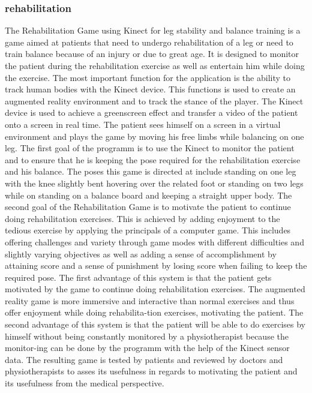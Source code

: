 \subsubsection{rehabilitation}
The Rehabilitation Game using Kinect for leg stability and balance training is a game aimed at patients that need to undergo rehabilitation of a leg or need to train balance because of an injury or due to great age. It is designed to monitor the patient during the rehabilitation exercise as well as entertain him while doing the exercise. The most important function for the application is the ability to track human bodies with the Kinect device. This functions is used to create an augmented reality environment and to track the stance of the player.
The Kinect device is used to achieve a greenscreen effect and transfer a video of the patient onto a screen in real time. The patient sees himself on a screen in a virtual environment and plays the game by moving his free limbs while balancing on one leg. The first goal of the programm is to use the Kinect to monitor the patient and to ensure that he is keeping the pose required for the rehabilitation exercise and his balance. The poses this game is directed at include standing on one leg with the knee slightly bent hovering over the related foot or standing on two legs while on standing on a balance board and keeping a straight upper body.
The second goal of the Rehabilitation Game is to motivate the patient to continue doing rehabilitation exercises. This is achieved by adding enjoyment to the tedious exercise by applying the principals of a computer game. This includes offering challenges and variety through game modes with different difficulties and slightly varying objectives as well as adding a sense of accomplishment by attaining score and a sense of punishment by losing score when failing to keep the required pose.
The first advantage of this system is that the patient gets motivated by the game to continue doing rehabilitation exercises. The augmented reality game is more immersive and interactive than normal exercises and thus offer enjoyment while doing rehabilita-tion exercises, motivating the patient.
The second advantage of this system is that the patient will be able to do exercises by himself without being constantly monitored by a physiotherapist because the monitor-ing can be done by the programm with the help of the Kinect sensor data.
The resulting game is tested by patients and reviewed by doctors and physiotherapists to asses its usefulness in regards to motivating the patient and its usefulness from the medical perspective.
